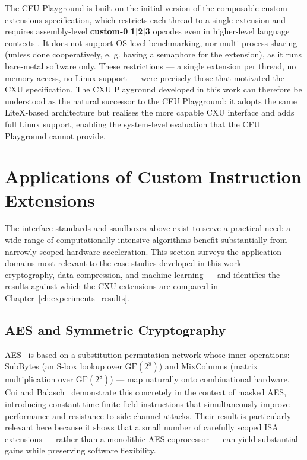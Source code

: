 The CFU Playground is built on the initial version of the composable custom extensions
specification, which restricts each thread to a single extension and requires assembly-level
\textbf{custom-0|1|2|3} opcodes even in higher-level language contexts
\cite{Gray2022CFU, CFUPlayground2022}.
It does not support OS-level benchmarking,
nor multi-process sharing (unless done cooperatively, e. g. having a semaphore for the extension),
as it runs bare-metal software only.
These restrictions --- a single extension per thread, no memory access, no Linux support ---
were precisely those that motivated the CXU specification.
The CXU Playground developed in this work can therefore be understood as the natural
successor to the CFU Playground: it adopts the same LiteX-based architecture but
realises the more capable CXU interface and adds full Linux support, enabling the
system-level evaluation that the CFU Playground cannot provide.

\section{Applications of Custom Instruction Extensions}
\label{sec:related_applications}

The interface standards and sandboxes above exist to serve a practical need: a wide
range of computationally intensive algorithms benefit substantially from narrowly
scoped hardware acceleration.
This section surveys the application domains most relevant to the case studies
developed in this work --- cryptography, data compression, and machine learning --- and
identifies the results against which the CXU extensions are compared in
Chapter~\ref{ch:experiments_results}.

\subsection{AES and Symmetric Cryptography}
\label{subsec:related_aes}

AES~\cite{NISTAES} is based on a substitution-permutation network whose inner
operations: SubBytes (an S-box lookup over $\text{GF}(2^8)$) and MixColumns
(matrix multiplication over $\text{GF}(2^8)$) --- map naturally onto
combinational hardware.
Cui and Balasch~\cite{Cui2023MaskingAES} demonstrate this concretely in the context
of masked AES, introducing constant-time finite-field instructions that simultaneously
improve performance and resistance to side-channel attacks.
Their result is particularly relevant here because it shows that a small number of
carefully scoped ISA extensions --- rather than a monolithic AES coprocessor --- can
yield substantial gains while preserving software flexibility.


